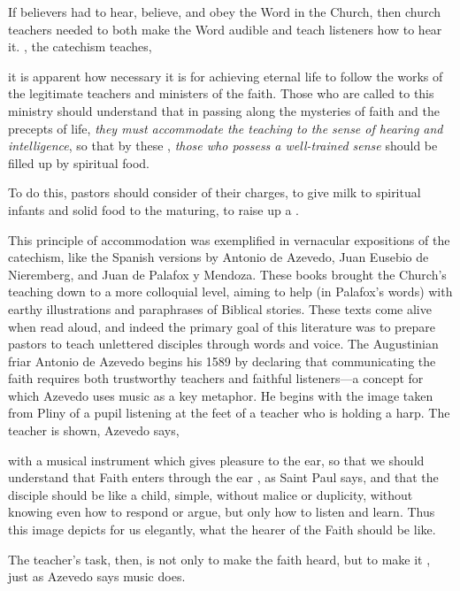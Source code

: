 If believers had to hear, believe, and obey the Word in the Church, then church
teachers needed to both make the Word audible and teach listeners how to hear
it. 
, the
catechism teaches, 
\begin{quoting}
    it is apparent how necessary it is for achieving eternal life to follow the
    works of the legitimate teachers and ministers of the faith. 
    \Dots{} Those who are called to this ministry should understand that in
    passing along the mysteries of faith and the precepts of life, \emph{they
    must accommodate the teaching to the sense of hearing and intelligence}, so
    that by these , \emph{those who possess a
    well-trained sense} should be filled up by spiritual food.%
        \Autocite[2, 8--9 (emphasis added)]{Catholic:Catechismus1614}
\end{quoting}
To do this, pastors should consider  of their charges, to give milk to spiritual infants and solid food
to the maturing, to raise up a .%
    \Autocite[8]{Catholic:Catechismus1614}

This principle of accommodation was exemplified in vernacular expositions of
the catechism, like the Spanish versions by Antonio de Azevedo, Juan Eusebio de
Nieremberg, and Juan de Palafox y Mendoza.%
    \Autocites
    {Azevedo:Catecismo}
    {Nieremberg:PracticaCatecismo}
    {Palafox:Bocados}
These books brought the Church's teaching down to a more colloquial level,
aiming to help  (in Palafox's words) with
earthy illustrations and paraphrases of Biblical stories.
These texts come alive when read aloud, and indeed the primary goal of this
literature was to prepare pastors to teach unlettered disciples through words
and voice.
The Augustinian friar Antonio de Azevedo begins his 1589  by declaring that communicating the faith requires
both trustworthy teachers and faithful listeners---a concept for which Azevedo
uses music as a key metaphor.
He begins with the image taken from Pliny of a pupil listening at the feet of a
teacher who is holding a harp.
The teacher is shown, Azevedo says,
\begin{quoting}
    with a musical instrument which gives pleasure to the ear, so that we should
    understand that Faith enters through the ear , as Saint Paul
    says, and that the disciple should be like a child, simple, without malice
    or duplicity, without knowing even how to respond or argue, but only how to
    listen and learn.
    Thus this image depicts for us elegantly, what the hearer of the Faith
    should be like.%
        \Autocite[]{Azevedo:Catecismo}
\end{quoting}
The teacher's task, then, is not only to make the faith heard, but to make it
, just as Azevedo says music does.

